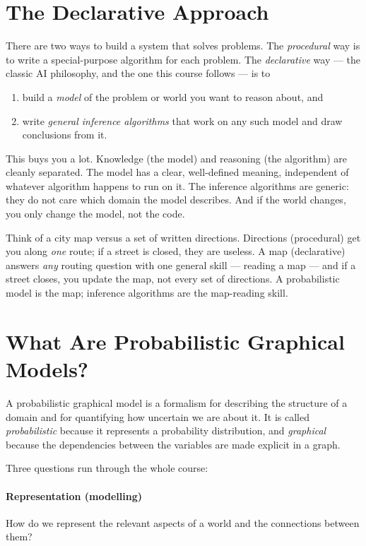 \documentclass[11pt, oneside]{book}
\let\originalsection\section
\renewcommand{\section}{\Needspace{7\baselineskip}\originalsection}
\begin{document}
\section{The Declarative Approach}

There are two ways to build a system that solves problems. The
\emph{procedural} way is to write a special-purpose algorithm for each problem.
The \emph{declarative} way --- the classic AI philosophy, and the one this
course follows --- is to
\begin{enumerate}
  \item build a \emph{model} of the problem or world you want to reason about,
    and
  \item write \emph{general inference algorithms} that work on any such model
    and draw conclusions from it.
\end{enumerate}

This buys you a lot. Knowledge (the model) and reasoning (the algorithm) are
cleanly separated. The model has a clear, well-defined meaning, independent of
whatever algorithm happens to run on it. The inference algorithms are generic:
they do not care which domain the model describes. And if the world changes,
you only change the model, not the code.

\begin{intbox}
Think of a city map versus a set of written directions. Directions
(procedural) get you along \emph{one} route; if a street is closed, they are
useless. A map (declarative) answers \emph{any} routing question with one
general skill --- reading a map --- and if a street closes, you update the map,
not every set of directions. A probabilistic model is the map; inference
algorithms are the map-reading skill.
\end{intbox}

\section{What Are Probabilistic Graphical Models?}

A probabilistic graphical model is a formalism for describing the structure of
a domain and for quantifying how uncertain we are about it. It is called
\emph{probabilistic} because it represents a probability distribution, and
\emph{graphical} because the dependencies between the variables are made
explicit in a graph.

Three questions run through the whole course:

\paragraph{Representation (modelling)} How do we represent the relevant
aspects of a world and the connections between them?
\end{document}

